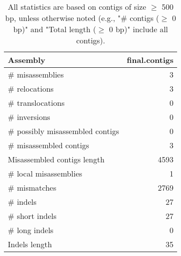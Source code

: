 \documentclass[12pt,a4paper]{article}
\begin{document}
\begin{table}[ht]
\begin{center}
\caption{All statistics are based on contigs of size $\geq$ 500 bp, unless otherwise noted (e.g., "\# contigs ($\geq$ 0 bp)" and "Total length ($\geq$ 0 bp)" include all contigs).}
\begin{tabular}{|l*{1}{|r}|}
\hline
Assembly & final.contigs \\ \hline
\# misassemblies & 3 \\ \hline
\hspace{5mm}\# relocations & 3 \\ \hline
\hspace{5mm}\# translocations & 0 \\ \hline
\hspace{5mm}\# inversions & 0 \\ \hline
\# possibly misassembled contigs & 0 \\ \hline
\# misassembled contigs & 3 \\ \hline
Misassembled contigs length & 4593 \\ \hline
\# local misassemblies & 1 \\ \hline
\# mismatches & 2769 \\ \hline
\# indels & 27 \\ \hline
\hspace{5mm}\# short indels & 27 \\ \hline
\hspace{5mm}\# long indels & 0 \\ \hline
Indels length & 35 \\ \hline
\end{tabular}
\end{center}
\end{table}
\end{document}
